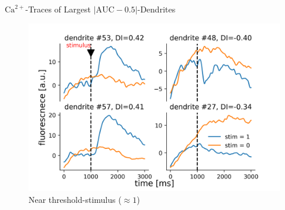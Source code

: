 \documentclass[10pt]{beamer}
\begin{document}
\begin{frame}[fragile]{$\text{Ca}^{2+}$-Traces of Largest $|\text{AUC}-0.5|$-Dendrites}
\begin{center}
	\begin{figure}
      \includegraphics[width=1.0\textwidth]{on_vs_off.png}
      \caption*{Near threshold-stimulus ($\approx 1$)}
	\end{figure}
	\end{center}
\end{frame}

\end{document}
